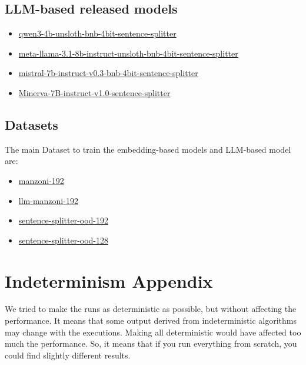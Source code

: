 \documentclass[11pt]{article}
\begin{document}
\subsection{LLM-based released models}

\begin{itemize}
	\item 
	\href{https://huggingface.co/fax4ever/qwen3-4b-unsloth-bnb-4bit-sentence-splitter}{qwen3-4b-unsloth-bnb-4bit-sentence-splitter}
	\item 
	\href{https://huggingface.co/fax4ever/meta-llama-3.1-8b-instruct-unsloth-bnb-4bit-sentence-splitter}{meta-llama-3.1-8b-instruct-unsloth-bnb-4bit-sentence-splitter}
	\item \href{https://huggingface.co/fax4ever/mistral-7b-instruct-v0.3-bnb-4bit-sentence-splitter}{mistral-7b-instruct-v0.3-bnb-4bit-sentence-splitter}
	\item \href{https://huggingface.co/fax4ever/Minerva-7B-instruct-v1.0-sentence-splitter}{Minerva-7B-instruct-v1.0-sentence-splitter}
\end{itemize}

\subsection{Datasets}

The main Dataset to train the embedding-based models and LLM-based model are:

\begin{itemize}
	\item \href{https://huggingface.co/datasets/fax4ever/manzoni-192}{manzoni-192}
	\item \href{https://huggingface.co/datasets/fax4ever/llm-manzoni-192}{llm-manzoni-192}
    \item \href{https://huggingface.co/datasets/fax4ever/sentence-splitter-ood-192}{sentence-splitter-ood-192}
    \item \href{https://huggingface.co/datasets/fax4ever/sentence-splitter-ood-128}{sentence-splitter-ood-128}
\end{itemize}

\section{Indeterminism Appendix}
\label{sec:appendix3}

We tried to make the runs as deterministic as possible, but without affecting the
performance.
It means that some output derived from indeterministic algorithms may change with the executions.
Making all deterministic would have affected too much the performance.
So, it means that if you run everything from scratch, you could find slightly different results.
\end{document}
